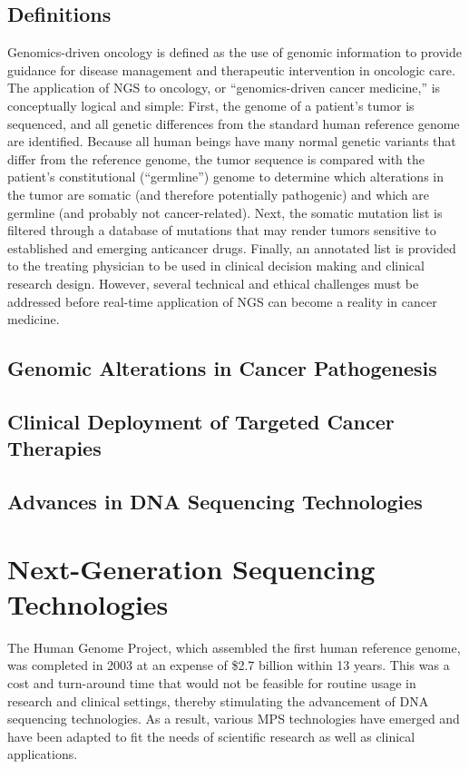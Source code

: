 \subsection{Definitions}
Genomics-driven oncology is defined as the use of genomic information to provide guidance for disease management and therapeutic intervention in oncologic care. The application of NGS to oncology, or “genomics-driven cancer medicine,” is conceptually logical and simple: First, the genome of a patient’s tumor is sequenced, and all genetic differences from the standard human reference genome are identified. Because all human beings have many normal genetic variants that differ from the reference genome, the tumor sequence is compared with the patient’s constitutional (“germline”) genome to determine which alterations in the tumor are somatic (and therefore potentially pathogenic) and which are germline (and probably not cancer-related). Next, the somatic mutation list is filtered through a database of mutations that may render tumors sensitive to established and emerging anticancer drugs. Finally, an annotated list is provided to the treating physician to be used in clinical decision making and clinical research design. However, several technical and ethical challenges must be addressed before real-time application of NGS can become a reality in cancer medicine.

\subsection{Genomic Alterations in Cancer Pathogenesis}

\subsection{Clinical Deployment of Targeted Cancer Therapies}

\subsection{Advances in DNA Sequencing Technologies}

\section{Next-Generation Sequencing Technologies}
\label{sec:Next-GenerationSequencingTechnologies}

The Human Genome Project, which assembled the first human reference genome, was completed in 2003 at an expense of \$2.7 billion within 13 years. This was a cost and turn-around time that would not be feasible for routine usage in research and clinical settings, thereby stimulating the advancement of DNA sequencing technologies. As a result, various MPS technologies have emerged and have been adapted to fit the needs of scientific research as well as clinical applications.

